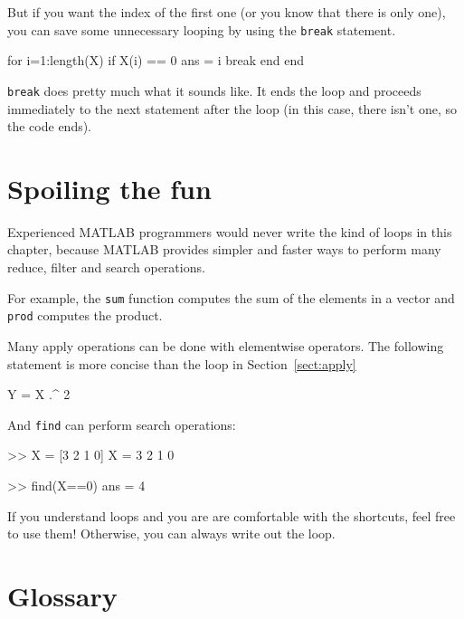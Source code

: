 \documentclass[
]{book}
\numberwithin{Answer}{chapter}
\numberwithin{Exercise}{chapter}
\begin{document}
But if you want the index of the first one (or you know that there
is only one), you can save some unnecessary looping by using the
{\tt break} statement.


\begin{code}
for i=1:length(X)
    if X(i) == 0
        ans = i
        break
    end
end
\end{code}

{\tt break} does pretty much what it sounds like.  It ends the
loop and proceeds immediately to the next statement after the
loop (in this case, there isn't one, so the code ends).


\section{Spoiling the fun}

Experienced MATLAB programmers would never write the kind of loops
in this chapter, because MATLAB provides simpler and faster ways to
perform many reduce, filter and search operations.

For example, the {\tt sum} function computes the sum of the elements
in a vector and {\tt prod} computes the product.

Many apply operations can be done with elementwise operators.
The following statement is more concise than the loop in
Section~\ref{sect:apply}

\begin{code}
Y = X .^ 2
\end{code}

And {\tt find} can perform search operations:

\begin{code}
>> X = [3 2 1 0]
X = 3     2     1     0

>> find(X==0)
ans = 4
\end{code}

If you understand loops and you are are comfortable with the
shortcuts, feel free to use them!  Otherwise, you can always write
out the loop.





\section{Glossary}
\end{document}
